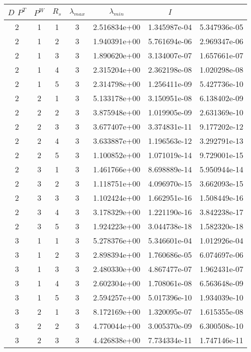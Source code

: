 \documentclass{article}
\begin{document}
\begin{table}
\begin{center}
\begin{tabular}{|cccc|ccc|} \hline
$D$ $P^T$  & $P^W$ & $R_s$ & $\lambda_{max}$ & $\lambda_{min}$   & $I$ \\
  \hline
2 & 1 & 1 & 3 & 2.516834e+00 & 1.345987e-04 & 5.347936e-05 \\ 
2 & 1 & 2 & 3 & 1.940391e+00 & 5.761694e-06 & 2.969347e-06 \\ 
2 & 1 & 3 & 3 & 1.890620e+00 & 3.134007e-07 & 1.657661e-07 \\ 
2 & 1 & 4 & 3 & 2.315204e+00 & 2.362198e-08 & 1.020298e-08 \\ 
2 & 1 & 5 & 3 & 2.314798e+00 & 1.256411e-09 & 5.427736e-10 \\ 
2 & 2 & 1 & 3 & 5.133178e+00 & 3.150951e-08 & 6.138402e-09 \\ 
2 & 2 & 2 & 3 & 3.875948e+00 & 1.019905e-09 & 2.631369e-10 \\ 
2 & 2 & 3 & 3 & 3.677407e+00 & 3.374831e-11 & 9.177202e-12 \\ 
2 & 2 & 4 & 3 & 3.633887e+00 & 1.196563e-12 & 3.292791e-13 \\ 
2 & 2 & 5 & 3 & 1.100852e+00 & 1.071019e-14 & 9.729001e-15 \\ 
2 & 3 & 1 & 3 & 1.461766e+00 & 8.698889e-14 & 5.950944e-14 \\ 
2 & 3 & 2 & 3 & 1.118751e+00 & 4.096970e-15 & 3.662093e-15 \\ 
2 & 3 & 3 & 3 & 1.102424e+00 & 1.662951e-16 & 1.508449e-16 \\ 
2 & 3 & 4 & 3 & 3.178329e+00 & 1.221190e-16 & 3.842238e-17 \\ 
2 & 3 & 5 & 3 & 1.924223e+00 & 3.044738e-18 & 1.582320e-18 \\ 
3 & 1 & 1 & 3 & 5.278376e+00 & 5.346601e-04 & 1.012926e-04 \\ 
3 & 1 & 2 & 3 & 2.898394e+00 & 1.760686e-05 & 6.074697e-06 \\ 
3 & 1 & 3 & 3 & 2.480330e+00 & 4.867477e-07 & 1.962431e-07 \\ 
3 & 1 & 4 & 3 & 2.602304e+00 & 1.708061e-08 & 6.563648e-09 \\ 
3 & 1 & 5 & 3 & 2.594257e+00 & 5.017396e-10 & 1.934039e-10 \\ 
3 & 2 & 1 & 3 & 8.172169e+00 & 1.320095e-07 & 1.615355e-08 \\ 
3 & 2 & 2 & 3 & 4.770044e+00 & 3.005370e-09 & 6.300508e-10 \\ 
3 & 2 & 3 & 3 & 4.426838e+00 & 7.734334e-11 & 1.747146e-11 \\ 

\end{tabular}
\end{center}
\end{table}
\end{document}
